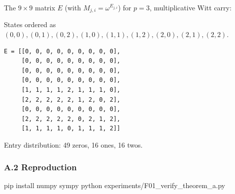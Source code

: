 \documentclass[
  11pt,
]{article}
\newenvironment{Shaded}{}{}
\newcommand{\ExtensionTok}[1]{#1}
\newcommand{\NormalTok}[1]{#1}
\begin{document}
The \(9 \times 9\) matrix \(E\) (with \(M_{j,i} = \omega^{E_{j,i}}\)) for
\(p = 3\), multiplicative Witt carry:

States ordered as
\((0,0), (0,1), (0,2), (1,0), (1,1), (1,2), (2,0), (2,1), (2,2)\).

\begin{verbatim}
E = [[0, 0, 0, 0, 0, 0, 0, 0, 0],
     [0, 0, 0, 0, 0, 0, 0, 0, 0],
     [0, 0, 0, 0, 0, 0, 0, 0, 0],
     [0, 0, 0, 0, 0, 0, 0, 0, 0],
     [1, 1, 1, 1, 2, 1, 1, 1, 0],
     [2, 2, 2, 2, 2, 1, 2, 0, 2],
     [0, 0, 0, 0, 0, 0, 0, 0, 0],
     [2, 2, 2, 2, 2, 0, 2, 1, 2],
     [1, 1, 1, 1, 0, 1, 1, 1, 2]]
\end{verbatim}

Entry distribution: 49 zeros, 16 ones, 16 twos.

\subsubsection{A.2 Reproduction}\label{a.2-reproduction}

\begin{Shaded}
\begin{Highlighting}[]
\ExtensionTok{pip}\NormalTok{ install numpy sympy}
\ExtensionTok{python}\NormalTok{ experiments/F01\_verify\_theorem\_a.py}
\end{Highlighting}
\end{Shaded}
\end{document}
